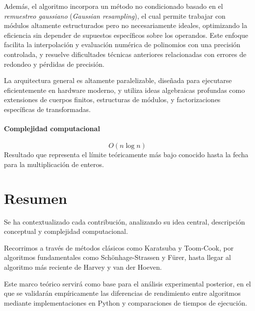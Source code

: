 Además, el algoritmo incorpora un método no condicionado basado en el \textit{remuestreo gaussiano} (\textit{Gaussian resampling}), el cual permite trabajar con módulos altamente estructurados pero no necesariamente ideales, optimizando la eficiencia sin depender de supuestos específicos sobre los operandos. Este enfoque facilita la interpolación y evaluación numérica de polinomios con una precisión controlada, y resuelve dificultades técnicas anteriores relacionadas con errores de redondeo y pérdidas de precisión.

La arquitectura general es altamente paralelizable, diseñada para ejecutarse eficientemente en hardware moderno, y utiliza ideas algebraicas profundas como extensiones de cuerpos finitos, estructuras de módulos, y factorizaciones específicas de transformadas.

\paragraph{Complejidad computacional} 
\[
    O(n \log n)
\]
Resultado que representa el límite teóricamente más bajo conocido hasta la fecha para la multiplicación de enteros.

\section{Resumen}

Se ha contextualizado cada contribución, analizando su idea central, descripción conceptual y complejidad computacional.

Recorrimos a través de métodos clásicos como Karatsuba y Toom-Cook, por algoritmos fundamentales como Schönhage-Strassen y Fürer, hasta llegar al algoritmo más reciente de Harvey y van der Hoeven.

Este marco teórico servirá como base para el análisis experimental posterior, en el que se validarán empíricamente las diferencias de rendimiento entre algoritmos mediante implementaciones en Python y comparaciones de tiempos de ejecución.
